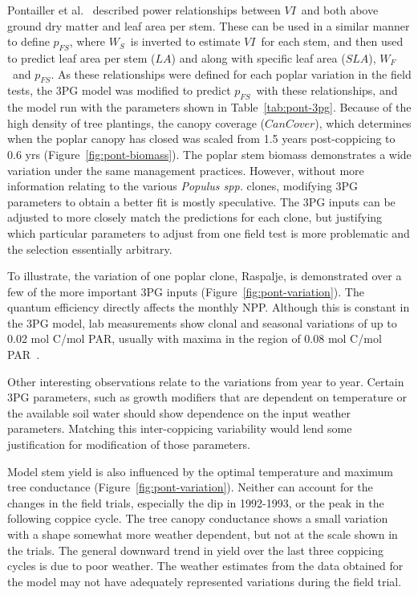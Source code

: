 \documentclass[10pt]{article}
\newcommand{\pop}{\textit{Populus spp.} }
\newcommand{\SLA}{\ensuremath{SLA}}
\newcommand{\WF}{\ensuremath{W_F}}
\newcommand{\WS}{\ensuremath{W_S}}
\newcommand{\pfs}{\ensuremath{p_{FS}}}
\newcommand{\VI}{\ensuremath{VI}}
\newcommand{\cancover}{\ensuremath{CanCover}}
\newcommand{\LA}{\ensuremath{LA}}
\begin{document}
Pontailler et al.~\cite{pontailler97-volume-index} described power relationships
between \VI~and both above ground dry matter and leaf area per stem. These can
be used in a similar manner to define \pfs, where \WS~is inverted to estimate
\VI~for each stem, and then used to predict leaf area per stem (\LA) and along
with specific leaf area (\SLA), \WF~and \pfs. As these relationships were
defined for each poplar variation in the field tests, the 3PG model was modified
to predict \pfs~with these relationships, and the model run with the parameters
shown in Table~\ref{tab:pont-3pg}.  Because of the high density of tree
plantings, the canopy coverage (\cancover), which determines when the poplar
canopy has closed was scaled from 1.5 years post-coppicing to 0.6 yrs
(Figure~\ref{fig:pont-biomass}). The poplar stem biomass demonstrates a wide
variation under the same management practices. However, without more information
relating to the various \pop clones, modifying 3PG parameters to obtain a better
fit is mostly speculative. The 3PG inputs can be adjusted to more closely match
the predictions for each clone, but justifying which particular parameters to
adjust from one field test is more problematic and the selection essentially
arbitrary.

To illustrate, the variation of one poplar clone, Raspalje, is demonstrated over
a few of the more important 3PG inputs (Figure~\ref{fig:pont-variation}). The
quantum efficiency directly affects the monthly NPP. Although this is constant
in the 3PG model, lab measurements show clonal and seasonal variations of up to
0.02 mol C/mol PAR, usually with maxima in the region of 0.08 mol C/mol
PAR~\cite{Bernacchi2003}.

Other interesting observations relate to the variations from year to
year. Certain 3PG parameters, such as growth modifiers that are dependent on
temperature or the available soil water should show dependence on the input
weather parameters. Matching this inter-coppicing variability would lend some
justification for modification of those parameters.

Model stem yield is also influenced by the optimal temperature and maximum tree
conductance (Figure~\ref{fig:pont-variation}). Neither can account for the
changes in the field trials, especially the dip in 1992-1993, or the peak in the
following coppice cycle. The tree canopy conductance shows a small variation
with a shape somewhat more weather dependent, but not at the scale shown in the
trials.  The general downward trend in yield over the last three coppicing
cycles is due to poor weather.  The weather estimates from the data obtained for
the model may not have adequately represented variations during the field trial.
\end{document}
